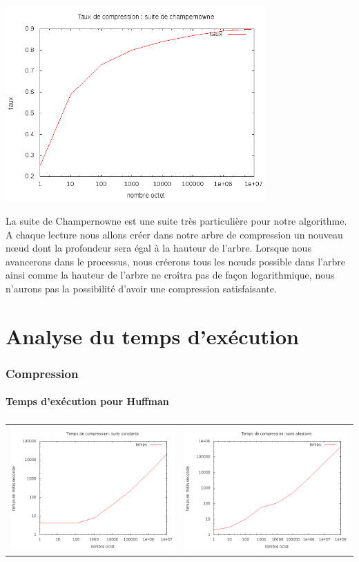 \documentclass{report}
\begin{document}
\begin{center}
\includegraphics[width=10cm]{champLZ.png}
\end{center}
La suite de Champernowne est une suite très particulière pour notre algorithme. A chaque lecture nous allons créer dans notre arbre de compression un nouveau nœud dont la profondeur sera égal à la hauteur de l'arbre. Lorsque nous avancerons dans le processus, nous créerons tous les nœuds possible dans l'arbre ainsi comme la hauteur de l'arbre ne croîtra pas de façon logarithmique, nous n'aurons pas la possibilité d'avoir une compression satisfaisante. 

\section*{Analyse du temps d’exécution}

\subsubsection*{Compression}
\paragraph*{}
\textbf{Temps d’exécution pour Huffman}
\subparagraph*{}
\hspace{-2cm}\begin{tabular}{l | l}
\includegraphics[width=7cm]{tempsChC.png} & 
\includegraphics[width=7cm]{tempsChA.png}
\end{tabular}
\end{document}
